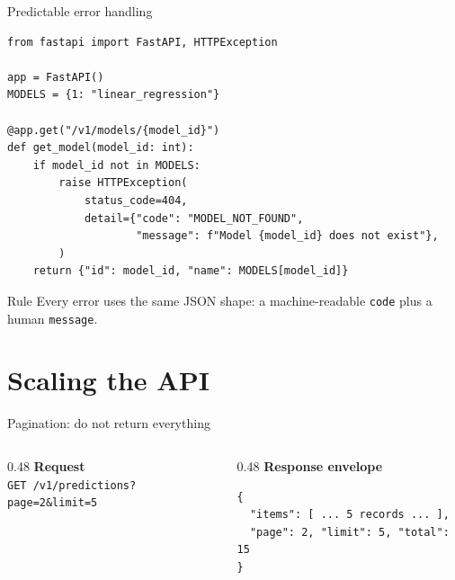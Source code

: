 \documentclass[aspectratio=169,10pt]{beamer}
\begin{document}
\begin{frame}[fragile]{Predictable error handling}
\begin{lstlisting}
from fastapi import FastAPI, HTTPException

app = FastAPI()
MODELS = {1: "linear_regression"}

@app.get("/v1/models/{model_id}")
def get_model(model_id: int):
    if model_id not in MODELS:
        raise HTTPException(
            status_code=404,
            detail={"code": "MODEL_NOT_FOUND",
                    "message": f"Model {model_id} does not exist"},
        )
    return {"id": model_id, "name": MODELS[model_id]}
\end{lstlisting}
\begin{alertblock}{Rule}
Every error uses the same JSON shape: a machine-readable \texttt{code} plus a human \texttt{message}.
\end{alertblock}
\end{frame}

\section{Scaling the API}

\begin{frame}[fragile]{Pagination: do not return everything}
\begin{center}
\end{center}
\vspace{0.2cm}
\begin{columns}[T]
\begin{column}{0.48\textwidth}
\textbf{Request}\\
\texttt{GET /v1/predictions?page=2\&limit=5}
\end{column}
\begin{column}{0.48\textwidth}
\textbf{Response envelope}
\begin{lstlisting}[numbers=none]
{
  "items": [ ... 5 records ... ],
  "page": 2, "limit": 5, "total": 15
}
\end{lstlisting}
\end{column}
\end{columns}
\end{frame}
\end{document}
